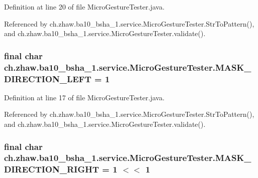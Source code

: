 Definition at line 20 of file MicroGestureTester.java.

Referenced by ch.zhaw.ba10\_\-bsha\_\-1.service.MicroGestureTester.StrToPattern(), and ch.zhaw.ba10\_\-bsha\_\-1.service.MicroGestureTester.validate().\hypertarget{classch_1_1zhaw_1_1ba10__bsha__1_1_1service_1_1MicroGestureTester_a05ec6c9016ce624ac7befd9a615ac316}{
\subsubsection[{MASK\_\-DIRECTION\_\-LEFT}]{\setlength{\rightskip}{0pt plus 5cm}final char {\bf ch.zhaw.ba10\_\-bsha\_\-1.service.MicroGestureTester.MASK\_\-DIRECTION\_\-LEFT} = 1}}
\label{classch_1_1zhaw_1_1ba10__bsha__1_1_1service_1_1MicroGestureTester_a05ec6c9016ce624ac7befd9a615ac316}


Definition at line 17 of file MicroGestureTester.java.

Referenced by ch.zhaw.ba10\_\-bsha\_\-1.service.MicroGestureTester.StrToPattern(), and ch.zhaw.ba10\_\-bsha\_\-1.service.MicroGestureTester.validate().\hypertarget{classch_1_1zhaw_1_1ba10__bsha__1_1_1service_1_1MicroGestureTester_a6e7e9529756ed13eb1c5c8866a495a75}{
\subsubsection[{MASK\_\-DIRECTION\_\-RIGHT}]{\setlength{\rightskip}{0pt plus 5cm}final char {\bf ch.zhaw.ba10\_\-bsha\_\-1.service.MicroGestureTester.MASK\_\-DIRECTION\_\-RIGHT} = 1 $<$$<$ 1}}
\label{classch_1_1zhaw_1_1ba10__bsha__1_1_1service_1_1MicroGestureTester_a6e7e9529756ed13eb1c5c8866a495a75}


